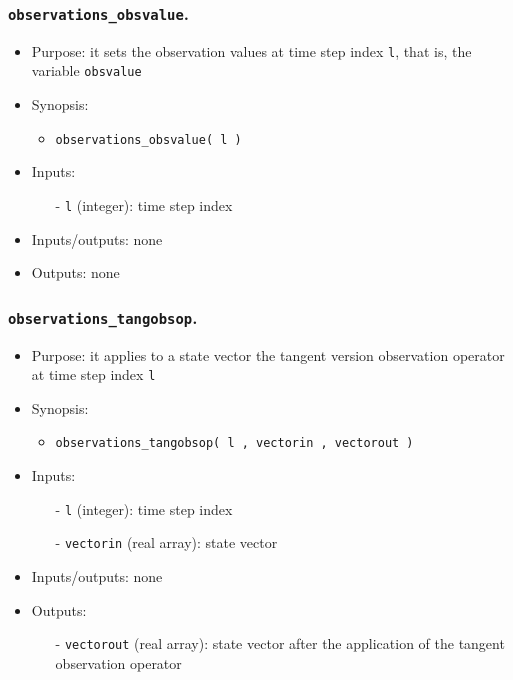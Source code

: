 \documentclass[12pt]{article}
\begin{document}
\subsubsection{{\tt observations\_obsvalue}.}
\begin{itemize}
\item Purpose: it sets the observation values at time step index {\tt l}, that is, the variable {\tt obsvalue}
\item Synopsis: 
\begin{itemize}
\item {\tt observations\_obsvalue( l )}
\end{itemize}
\item Inputs: 
\begin{itemize}
\item[-] {\tt l} (integer): time step index
\end{itemize}
\item Inputs/outputs: none
\item Outputs: none
\end{itemize} 

\subsubsection{{\tt observations\_tangobsop}.}
\begin{itemize}
\item Purpose: it applies to a state vector the tangent version observation operator at time step index {\tt l}
\item Synopsis: 
\begin{itemize}
\item {\tt observations\_tangobsop( l , vectorin , vectorout )}
\end{itemize}
\item Inputs: 
\begin{itemize}
\item[-] {\tt l} (integer): time step index
\item[-] {\tt vectorin} (real array): state vector
\end{itemize}
\item Inputs/outputs: none 
\item Outputs: 
\begin{itemize}
\item[-] {\tt vectorout} (real array): state vector after the application of the tangent observation operator
\end{itemize}
\end{itemize} 
\end{document}
